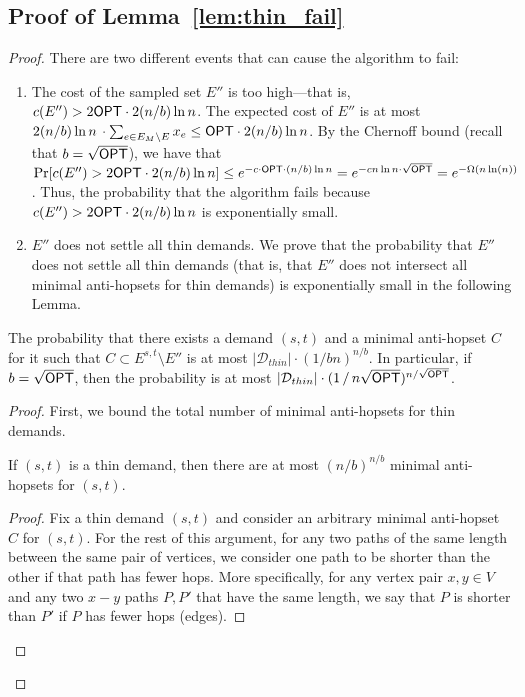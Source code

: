 \subsection{Proof of Lemma~\ref{lem:thin_fail}} \label{app:thin_proof}
\begin{proof}
    There are two different events that can cause the algorithm to fail:   
    \begin{enumerate}
        \item The cost of the sampled set $E''$ is too high---that is, $c(E'') > 2{{\sf OPT}} \cdot 2(n/b)  \ln{n}$. The expected cost of $E''$ is at most $2(n/b) \ln{n} \, \cdot \sum_{e \in E_M \setminus E} x_e \leq {{\sf OPT}} \cdot 2(n/b)  \ln{n}$. By the Chernoff bound (recall that $b = \sqrt{{{\sf OPT}}}$), we have that $\Pr[c(E'') > 2{{\sf OPT}} \cdot 2(n/b)  \ln{n} ] \leq e^{-c \cdot {{\sf OPT}} \cdot (n/b) \ln{n}} = e^{-c n\ln{n} \cdot \sqrt{{{\sf OPT}}}} = e^{-\Omega(n \ln(n))}$. Thus, the probability that the algorithm fails because $c(E'') > 2{{\sf OPT}} \cdot 2(n/b)  \ln{n}$ is exponentially small.
        \item $E''$ does not settle all thin demands. We prove that the probability that $E''$ does not settle all thin demands (that is, that $E''$ does not intersect all minimal anti-hopsets for thin demands) is exponentially small in the following Lemma.
    \end{enumerate}
    
    \begin{lemma} \label{lem:thin_not_settle}
        The probability that there exists a demand $(s,t)$ and a minimal anti-hopset $C$ for it such that $C \subset E^{s,t} \setminus E''$ is at most $|\mathcal{D}_{thin}| \cdot \left( 1 / b n \right)^{n/b}$. In particular, if $b = \sqrt{{{\sf OPT}}}$, then the probability is at most $|\mathcal{D}_{thin}| \cdot (1 \, / \, n\sqrt{{{\sf OPT}}})^{n/\sqrt{{\sf OPT}}}$.
    \end{lemma}
    \begin{proof}
        First, we bound the total number of minimal anti-hopsets for thin demands. 

        \begin{proposition} \label{prop:thin1}
            If $(s,t)$ is a thin demand, then there are at most $(n/b)^{n/b}$ minimal anti-hopsets for $(s,t)$. 
        \end{proposition}
        \begin{proof}
            Fix a thin demand $(s,t)$ and consider an arbitrary minimal anti-hopset $C$ for $(s,t)$. For the rest of this argument, for any two paths of the same length between the same pair of vertices, we consider one path to be shorter than the other if that path has fewer hops. More specifically, for any vertex pair $x, y \in V$ and any two $x-y$ paths $P, P'$ that have the same length, we say that $P$ is shorter than $P'$ if $P$ has fewer hops (edges).
            

\end{proof}
\end{proof}
\end{proof}
